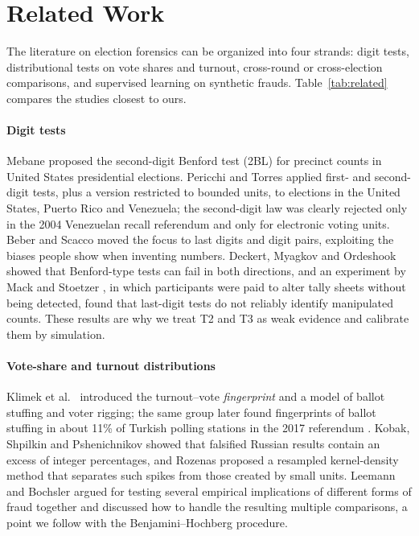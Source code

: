 \documentclass[fleqn,10pt]{SelfArx}
\begin{document}


\section{Related Work}
\label{sec:related}

The literature on election forensics can be organized into four strands:
digit tests, distributional tests on vote shares and turnout, cross-round or
cross-election comparisons, and supervised learning on synthetic frauds.
Table~\ref{tab:related} compares the studies closest to ours.

\paragraph{Digit tests} Mebane \cite{mebane2008} proposed the second-digit
Benford test (2BL) for precinct counts in United States presidential
elections. Pericchi and Torres \cite{pericchi2011} applied first- and
second-digit tests, plus a version restricted to bounded units, to
elections in the United States, Puerto Rico and Venezuela; the second-digit
law was clearly rejected only in the 2004 Venezuelan recall referendum and
only for electronic voting units. Beber and Scacco \cite{beber2012} moved
the focus to last digits and digit pairs, exploiting the biases people show
when inventing numbers. Deckert, Myagkov and Ordeshook \cite{deckert2011}
showed that Benford-type tests can fail in both directions, and an
experiment by Mack and Stoetzer \cite{mack2019}, in which participants
were paid to alter tally sheets without being detected, found that
last-digit tests do not reliably identify manipulated counts. These results
are why we treat T2 and T3 as weak evidence and calibrate them by
simulation.

\paragraph{Vote-share and turnout distributions} Klimek et al.\
\cite{klimek2012} introduced the turnout--vote \emph{fingerprint} and a
model of ballot stuffing and voter rigging; the same group later found
fingerprints of ballot stuffing in about 11\% of Turkish polling stations in
the 2017 referendum \cite{klimek2018}. Kobak, Shpilkin and Pshenichnikov
\cite{kobak2016} showed that falsified Russian results contain an excess of
integer percentages, and Rozenas \cite{rozenas2017} proposed a resampled
kernel-density method that separates such spikes from those created by
small units. Leemann and Bochsler \cite{leemann2014} argued for testing
several empirical implications of different forms of fraud together and
discussed how to handle the resulting multiple comparisons, a point we
follow with the Benjamini--Hochberg procedure.
\end{document}
